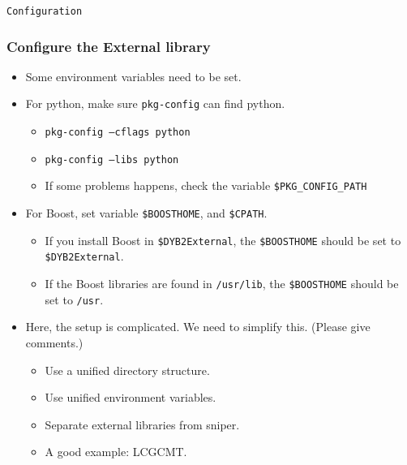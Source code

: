 \begin{frame}
    \begin{center}
        \LARGE \tt{Configuration}
    \end{center}
\end{frame}

\begin{frame}
    \frametitle{Configure the External library}
    \begin{itemize}
        \item Some environment variables need to be
            set.
        \item For python, make sure {\tt pkg-config}
            can find python.
            \begin{itemize}
                \item {\tt pkg-config --cflags python}
                \item {\tt pkg-config --libs python}
                \item If some problems happens, check
                    the variable {\tt \$PKG\_CONFIG\_PATH}
            \end{itemize}
        \item For Boost, set variable {\tt \$BOOSTHOME}, and {\tt \$CPATH}.
            \begin{itemize}
                \item If you install Boost in {\tt \$DYB2External},
                    the {\tt \$BOOSTHOME} should be set to
                    {\tt \$DYB2External}.
                \item If the Boost libraries are found in 
                    {\tt /usr/lib}, the {\tt \$BOOSTHOME}
                    should be set to {\tt /usr}.
            \end{itemize}
        \item Here, the setup is complicated.
            We need to simplify this. (Please give comments.)
            \begin{itemize}
                \item Use a unified directory structure.
                \item Use unified environment variables.
                \item Separate external libraries from sniper.
                \item A good example: LCGCMT.
            \end{itemize}
    \end{itemize}
\end{frame}

